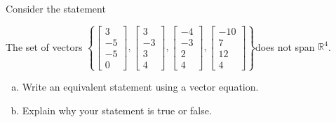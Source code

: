 
\begin{exerciseStatement}


Consider the statement 
\begin{center}\begin{minipage}{0.8\textwidth}
 The set of vectors \( \left\{ \left[\begin{array}{c}
3 \\
-5 \\
-5 \\
0
\end{array}\right] , \left[\begin{array}{c}
3 \\
-3 \\
3 \\
4
\end{array}\right] , \left[\begin{array}{c}
-4 \\
-3 \\
2 \\
4
\end{array}\right] , \left[\begin{array}{c}
-10 \\
7 \\
12 \\
4
\end{array}\right] \right\} \)does not span \(\mathbb{R}^4\). 
\end{minipage}\end{center}
    


\begin{enumerate}[(a)]
\item  Write an equivalent statement using a vector equation.
\item  Explain why your statement is true or false.
\end{enumerate}
    
\end{exerciseStatement}
    
